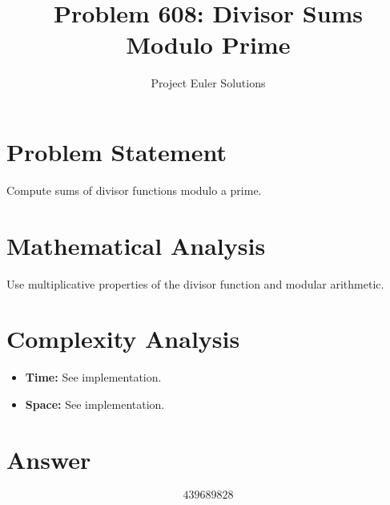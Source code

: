 \documentclass[11pt]{article}
\title{Problem 608: Divisor Sums Modulo Prime}
\author{Project Euler Solutions}
\date{}
\begin{document}
\maketitle

\section{Problem Statement}
Compute sums of divisor functions modulo a prime.

\section{Mathematical Analysis}
Use multiplicative properties of the divisor function and modular arithmetic.

\section{Complexity Analysis}
\begin{itemize}
    \item \textbf{Time:} See implementation.
    \item \textbf{Space:} See implementation.
\end{itemize}

\section{Answer}

\[
\boxed{439689828}
\]
\end{document}
